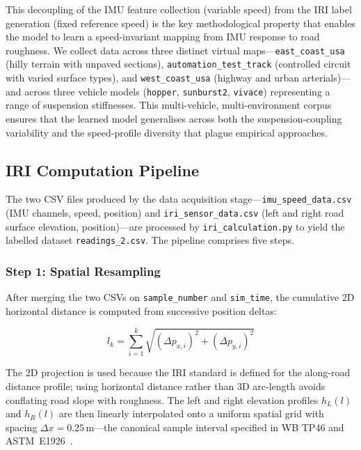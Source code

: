 \documentclass[conference]{IEEEtran}
\begin{document}
This decoupling of the IMU feature collection (variable speed) from the IRI label generation (fixed reference speed) is the key methodological property that enables the model to learn a speed-invariant mapping from IMU response to road roughness.
We collect data across three distinct virtual maps---\texttt{east\_coast\_usa} (hilly terrain with unpaved sections), \texttt{automation\_test\_track} (controlled circuit with varied surface types), and \texttt{west\_coast\_usa} (highway and urban arterials)---and across three vehicle models (\texttt{hopper}, \texttt{sunburst2}, \texttt{vivace}) representing a range of suspension stiffnesses.
This multi-vehicle, multi-environment corpus ensures that the learned model generalises across both the suspension-coupling variability and the speed-profile diversity that plague empirical approaches.

\subsection{IRI Computation Pipeline}
\label{sec:iri_pipeline}

The two CSV files produced by the data acquisition stage---\texttt{imu\_speed\_data.csv} (IMU channels, speed, position) and \texttt{iri\_sensor\_data.csv} (left and right road surface elevation, position)---are processed by \texttt{iri\_calculation.py} to yield the labelled dataset \texttt{readings\_2.csv}.
The pipeline comprises five steps.

\subsubsection{Step 1: Spatial Resampling}

After merging the two CSVs on \texttt{sample\_number} and \texttt{sim\_time}, the cumulative 2D horizontal distance is computed from successive position deltas:

\begin{equation}
\label{eq:cum_dist}
l_k = \sum_{i=1}^{k} \sqrt{(\Delta p_{x,i})^2 + (\Delta p_{y,i})^2}
\end{equation}

The 2D projection is used because the IRI standard is defined for the along-road distance profile;
using horizontal distance rather than 3D arc-length avoids conflating road slope with roughness.
The left and right elevation profiles $h_L(l)$ and $h_R(l)$ are then linearly interpolated onto a uniform spatial grid with spacing $\Delta x = 0.25\,\text{m}$---the canonical sample interval specified in WB TP46 and ASTM~E1926~\cite{sayers1986guidelines}.
\end{document}
